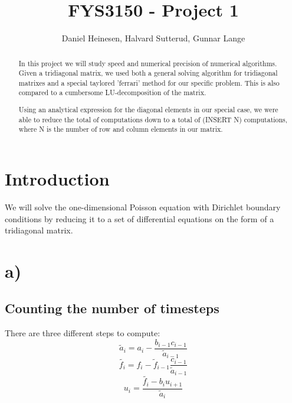 \documentclass[a4paper, 10pt]{article}
\title{FYS3150 - Project 1}
\author{Daniel Heinesen, Halvard Sutterud, Gunnar Lange}
\begin{document}
\maketitle
\begin{abstract}

    In this project we will study speed and numerical precision of
    numerical algorithms. Given a tridiagonal matrix, we used both a
    general solving algorithm for tridiagonal matrixes and a special
    taylored 'ferrari' method for our specific problem. This is also
    compared to a cumbersome LU-decomposition of the matrix.



    Using an analytical expression for the diagonal elements in our special
    case, we were able to reduce the total of computations down to a total
    of (INSERT N) computations, where N is the number of row and column
    elements in our matrix. 

    

\end{abstract}
\tableofcontents

\section*{Introduction }
    We will solve the one-dimensional Poisson equation with
    Dirichlet boundary conditions by reducing it to a set of differential
    equations on the form of a tridiagonal matrix. 

\section*{a)}
\subsection*{Counting the number of timesteps}
There are three different steps to compute:
\begin{equation}
\tilde{a}_i=a_i-\frac{b_{i-1}c_{i-1}}{\tilde{a}_{i-1}}
\end{equation}
\begin{equation}
\tilde{f_i}=f_i-\tilde{f}_{i-1}\frac{c_{i-1}}{\tilde{a}_{i-1}}
\end{equation}
\begin{equation}
u_i=\frac{\tilde{f_i}-b_iu_{i+1}}{\tilde{a}_i}
\end{equation}
\end{document}
